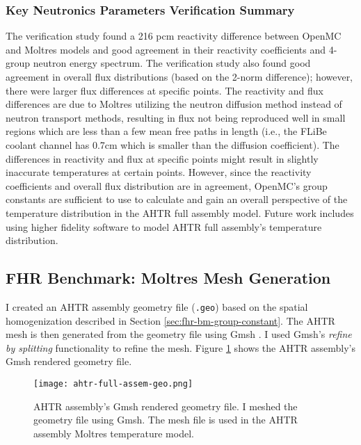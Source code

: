 \subsubsection{Key Neutronics Parameters Verification Summary}
The verification study found a 216 pcm reactivity difference between OpenMC 
and Moltres models and good agreement in their reactivity coefficients and 4-group 
neutron energy spectrum.
The verification study also found good agreement in overall flux distributions 
(based on the 2-norm difference); however, there were larger flux differences at 
specific points. 
The reactivity and flux differences are due to Moltres utilizing the neutron
diffusion method instead of neutron transport methods, resulting in flux not 
being reproduced well in small regions which are less than a few mean free paths 
in length (i.e., the FLiBe coolant channel has 0.7cm which is smaller than 
the diffusion coefficient). 
The differences in reactivity and flux at specific points might result in
slightly inaccurate temperatures at certain points. 
However, since the reactivity coefficients and overall flux distribution are in 
agreement, OpenMC's group constants are sufficient to use to calculate and gain 
an overall perspective of the temperature distribution in the \gls{AHTR} full 
assembly model. 
Future work includes using higher fidelity software to model \gls{AHTR} full 
assembly's temperature distribution. 

\subsection{FHR Benchmark: Moltres Mesh Generation}
I created an \gls{AHTR} assembly geometry file (\texttt{.geo}) based on the spatial 
homogenization described in Section \ref{sec:fhr-bm-group-constant}.
The \gls{AHTR} mesh is then generated from the geometry file using Gmsh 
\cite{geuzaine_gmsh_2009}.
I used Gmsh's \textit{refine by splitting} functionality to refine the mesh.
Figure \ref{fig:ahtr-full-assem-geo} shows the \gls{AHTR} assembly's Gmsh rendered 
geometry file.
\begin{figure}[htbp]
    \centering
    \texttt{[image: ahtr-full-assem-geo.png]}
    \caption{\acrfull{AHTR} assembly's Gmsh rendered geometry file. 
    I meshed the geometry file using Gmsh.
    The mesh file is used in the \gls{AHTR} assembly Moltres temperature model.}
    \label{fig:ahtr-full-assem-geo}
\end{figure}

\pagebreak
